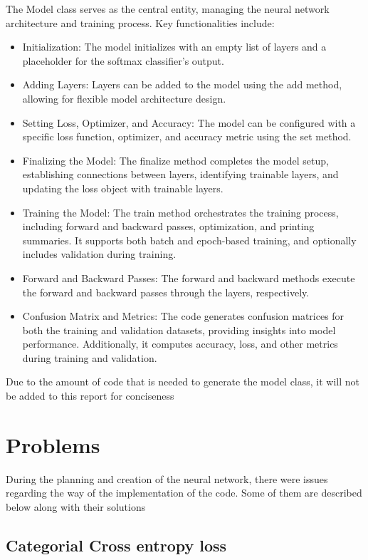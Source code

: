 \documentclass{article}
\begin{document}
The Model class serves as the central entity, managing the neural network architecture and training process. Key functionalities include: 
\begin{itemize}
\item Initialization: The model initializes with an empty list of layers and a placeholder for the softmax classifier's output.
\item Adding Layers: Layers can be added to the model using the add method, allowing for flexible model architecture design.
\item Setting Loss, Optimizer, and Accuracy: The model can be configured with a specific loss function, optimizer, and accuracy metric using the set method.
\item Finalizing the Model: The finalize method completes the model setup, establishing connections between layers, identifying trainable layers, and updating the loss object with trainable layers.
\item Training the Model: The train method orchestrates the training process, including forward and backward passes, optimization, and printing summaries. It supports both batch and epoch-based training, and optionally includes validation during training.
\item Forward and Backward Passes: The forward and backward methods execute the forward and backward passes through the layers, respectively.
\item Confusion Matrix and Metrics: The code generates confusion matrices for both the training and validation datasets, providing insights into model performance. Additionally, it computes accuracy, loss, and other metrics during training and validation.
\end{itemize}
Due to the amount of code that is needed to generate the model class, it will not be added to this report for conciseness

\pagebreak


\section{Problems}

During the planning and creation of the neural network, there were issues regarding the way of the implementation of the code. 
Some of them are described below along with their solutions 

\subsection{Categorial Cross entropy loss}
\end{document}
